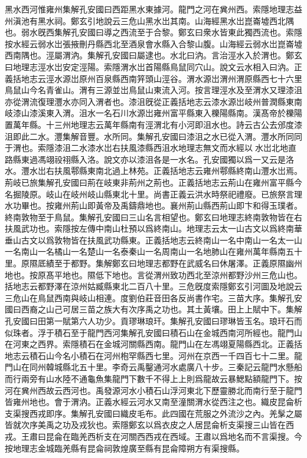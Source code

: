 黑水西河惟雍州集解孔安國曰西距黑水東據河。龍門之河在兾州西。索隱地理志益州滇池有黑水祠。鄭玄引地說云三危山黑水岀其南。山海經黑水岀崑崙墟西北隅也。弱水旣西集解孔安國曰導之西流至于合黎。鄭玄曰衆水皆東此獨西流也。索隱按水經云弱水岀張掖刪丹縣西北至酒泉會水縣入合黎山腹。山海經云弱水岀崑崙墟西南隅也。涇屬渭汭。集解孔安國曰屬逮也。水北曰汭。言治涇水入於渭也。鄭玄曰地理志涇水岀安定涇陽。索隱渭水岀首陽縣鳥鼠同穴山。說文云水相入曰汭。正義括地志云涇水源岀原州百泉縣西南笄頭山涇谷。渭水源岀渭州渭原縣西七十六里鳥鼠山今名青雀山。渭有三源並岀鳥鼠山東流入河。按言理涇水及至渭水又理漆沮亦從渭流復理灃水亦同入渭者也。漆沮旣從正義括地志云漆水源岀岐州普潤縣東南岐漆山漆溪東入渭。沮水一名石川水源岀雍州富平縣東入櫟陽縣南。漢髙帝於櫟陽置萬年縣。十三州地理志云萬年縣南有涇渭北有小河即沮水也。詩云古公去邠度漆沮即此二水。灃集解音豐。水所同。集解孔安國曰漆沮之水已從入渭。灃水所同同于渭也。索隱漆沮二水漆水岀右扶風漆縣西沮水地理志無文而水經以𣻐水岀北地直路縣東過馮翊祋祤縣入洛。說文亦以漆沮各是一水名。孔安國獨以爲一又云是洛水。灃水岀右扶風鄠縣東南北過上林苑。正義括地志云雍州鄠縣終南山灃水岀焉。荊岐已旅集解孔安國曰荊在岐東非荊州之荊也。正義括地志云荊山在雍州富平縣今名掘陵原。岐山在岐州岐山縣東北十里。尚書正義云洪水時祭祀禮廢。已旅祭言理水功畢也。按雍州荊山即黃帝及禹鑄鼎地也。襄州荊山縣西荊山即卞和得玉璞者。終南敦物至于鳥鼠。集解孔安國曰三山名言相望也。鄭玄曰地理志終南敦物皆在右扶風武功也。索隱按左傳中南山杜預以爲終南山。地理志云太一山古文以爲終南華垂山古文以爲敦物皆在扶風武功縣東。正義括地志云終南山一名中南山一名太一山一名南山一名橘山一名楚山一名泰秦山一名周南山一名地肺山在雍州萬年縣南五十里。原隰厎績至于都野。集解鄭玄曰地理志都野在武威名曰休屠澤。正義原隰幽州地也。按原髙平地也。隰低下地也。言從渭州致功西北至涼州都野沙州三危山也。括地志云都野澤在涼州姑臧縣東北二百八十里。三危旣度索隱鄭玄引河圖及地說云三危山在鳥鼠西南與岐山相連。度劉伯莊音田各反尚書作宅。三苗大序。集解孔安國曰西裔之山己可居三苗之族大有次序禹之功也。其土黃壤。田上上賦中下。集解孔安國曰田第一賦第六人功少。貢璆琳琅玕。集解孔安國曰璆琳皆玉名。琅玕石而似珠者。浮于積石至于龍門西河集解孔安國曰積石山在金城西南河所經也。龍門山在河東之西界。索隱積石在金城河關縣西南。龍門山在左馮翊夏陽縣西北。正義括地志云積石山今名小積石在河州枹罕縣西七里。河州在京西一千四百七十二里。龍門山在同州韓城縣北五十里。李奇云禹鑿通河水處廣八十步。三秦記云龍門水懸船而行兩旁有山水陸不通龜魚集龍門下數千不得上上則爲龍故云暴鰓點額龍門下。按河在兾州西故云西河也。禹發源河水小積石山浮河東北下歷靈勝北而南行至于龍門皆雍州地也。會于渭汭。正義水經云河水又南至潼關渭水從西注之也。織皮昆侖析支渠搜西戎即序。集解孔安國曰織皮毛布。此四國在荒服之外流沙之內。羌髳之屬皆就次序美禹之功及戎狄也。索隱鄭玄以爲衣皮之人居昆侖析支渠搜三山皆在西戎。王肅曰昆侖在臨羌西析支在河關西西戎在西域。王肅以爲地名而不言渠搜。今按地理志金城臨羌縣有昆侖祠敦煌廣至縣有昆侖障朔方有渠搜縣。

